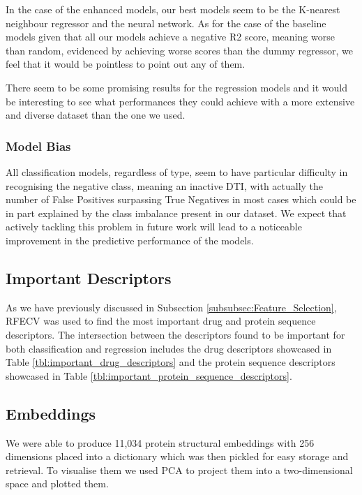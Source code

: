 In the case of the enhanced models, our best models seem to be the K-nearest neighbour regressor and the neural network. As for the case of the baseline models given that all our models achieve a negative R2 score, meaning worse than random, evidenced by achieving worse scores than the dummy regressor, we feel that it would be pointless to point out any of them.

There seem to be some promising results for the regression models and it would be interesting to see what performances they could achieve with a more extensive and diverse dataset than the one we used.

\subsubsection{Model Bias}

All classification models, regardless of type, seem to have particular difficulty in recognising the negative class, meaning an inactive DTI, with actually the number of False Positives surpassing True Negatives in most cases which could be in part explained by the class imbalance present in our dataset. We expect that actively tackling this problem in future work will lead to a noticeable improvement in the predictive performance of the models.

\subsection{Important Descriptors}

As we have previously discussed in Subsection \ref{subsubsec:Feature_Selection}, RFECV was used to find the most important drug and protein sequence descriptors. The intersection between the descriptors found to be important for both classification and regression includes the drug descriptors showcased in Table \ref{tbl:important_drug_descriptors} and the protein sequence descriptors showcased in Table \ref{tbl:important_protein_sequence_descriptors}.

\bigskip
\bigskip

\subsection{Embeddings}

We were able to produce 11,034 protein structural embeddings with 256 dimensions placed into a dictionary which was then pickled for easy storage and retrieval. To visualise them we used PCA to project them into a two-dimensional space and plotted them. 

